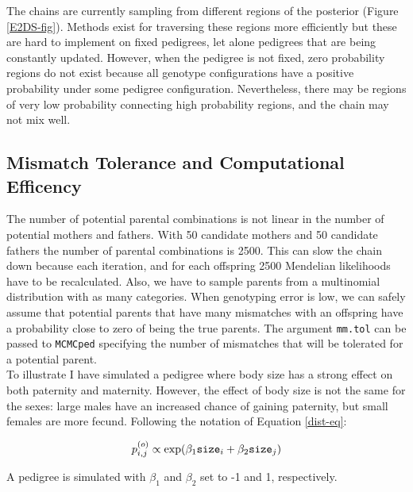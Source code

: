 \documentclass{article}
\begin{document}
The chains are currently sampling from different regions of the posterior (Figure \ref{E2DS-fig}).  Methods exist for traversing these regions \citep{Sheehan.2000, Lange.2002} more efficiently but these are hard to implement on fixed pedigrees, let alone pedigrees that are being constantly updated.  However, when the pedigree is not fixed, zero probability regions do not exist because all genotype configurations have a positive probability under some pedigree configuration.  Nevertheless, there may be regions of very low probability connecting high probability regions, and the chain may not mix well.   

\subsection{Mismatch Tolerance and Computational Efficency}
\label{MM}

The number of potential parental combinations is not linear in the number of potential mothers and fathers.  With 50 candidate mothers and 50 candidate fathers the number of parental combinations is 2500.  This can slow the chain down because each iteration, and for each offspring 2500 Mendelian likelihoods have to be recalculated.  Also, we have to sample parents from a multinomial distribution with as many categories.  When genotyping error is low, we can safely assume that potential parents that have many mismatches with an offspring have a probability close to zero of being the true parents.  The argument \texttt{mm.tol} can be passed to \texttt{MCMCped} specifying the number of mismatches that will be tolerated for a potential parent.\\

To illustrate I have simulated a pedigree where body size has a strong effect on both paternity and maternity.  However, the effect of body size is not the same for the sexes: large males have an increased chance of gaining paternity, but small females are more fecund. Following the notation of Equation \ref{dist-eq}:

\begin{equation}
p^{(o)}_{i,j} \propto \textrm{exp}(\beta_{1}\textrm{\texttt{size}}_{i} + \beta_{2}\textrm{\texttt{size}}_{j})
\end{equation}

A pedigree is simulated with $\beta_{1}$ and $\beta_{2}$ set to -1 and 1, respectively.
\end{document}
